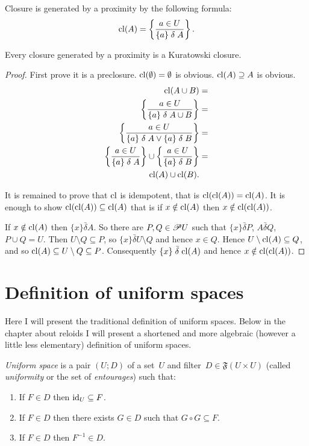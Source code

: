 \begin{defn}
Closure is generated by a proximity by the following formula:
\[
\operatorname{cl}(A)=\left\{ \frac{a\in U}{\{a\}\mathrel\delta A}\right\}.
\]
\end{defn}
\begin{prop}
Every closure generated by a proximity is a Kuratowski closure.\end{prop}
\begin{proof}
First prove it is a preclosure. $\operatorname{cl}(\emptyset)=\emptyset$ is obvious.
$\operatorname{cl}(A)\supseteq A$ is obvious.
\begin{align*}
\operatorname{cl}(A\cup B) & =\\
\left\{ \frac{a\in U}{\{a\}\mathrel\delta A\cup B}\right\} & =\\
\left\{ \frac{a\in U}{\{a\}\mathrel\delta A\lor\{a\}\mathrel\delta B}\right\} & =\\
\left\{ \frac{a\in U}{\{a\}\mathrel\delta A}\right\}\cup\left\{ \frac{a\in U}{\{a\}\mathrel\delta B}\right\} & =\\
\operatorname{cl}(A)\cup\operatorname{cl}(B).
\end{align*}


It is remained to prove that $\operatorname{cl}$ is idempotent, that is $\operatorname{cl}(\operatorname{cl}(A))=\operatorname{cl}(A)$.
It is enough to show $\operatorname{cl}(\operatorname{cl}(A))\subseteq\operatorname{cl}(A)$ that is if $x\notin\operatorname{cl}(A)$
then $x\notin\operatorname{cl}(\operatorname{cl}(A))$.

If $x\notin\operatorname{cl}(A)$ then $\{x\}\mathrel{\bar{\delta}}A$. So there
are $P,Q\in\mathscr{P} U$ such that $\{x\}\mathrel{\bar{\delta}}P$,
$A\mathrel{\bar{\delta}}Q$, $P\cup Q=U$. Then $U\setminus Q\subseteq P$,
so $\{x\}\mathrel{\bar{\delta}}U\setminus Q$ and hence $x\in Q$.
Hence $U\setminus\operatorname{cl}(A)\subseteq Q$, and so $\operatorname{cl}(A)\subseteq U\setminus Q\subseteq P$.
Consequently $\{x\}\mathrel{\bar{\delta}}\operatorname{cl}(A)$ and hence $x\notin\operatorname{cl}(\operatorname{cl}(A))$.
\end{proof}

\section{Definition of uniform spaces}

Here I will present the traditional definition of uniform spaces.
Below in the chapter about reloids I will present a shortened and
more algebraic (however a little less elementary) definition of uniform
spaces.
\begin{defn}
\emph{Uniform space} is a pair $(U;D)$ of a set~$U$ and filter~$D\in\mathfrak{F}(U\times U)$
(called \emph{uniformity} or the set of \emph{entourages}) such that:
\begin{enumerate}
\item If $F\in D$ then $\operatorname{id}_{U}\subseteq F$.
\item If $F\in D$ then there exists $G\in D$ such that $G\circ G\subseteq F$.
\item If $F\in D$ then $F^{-1}\in D$.\end{enumerate}
\end{defn}

